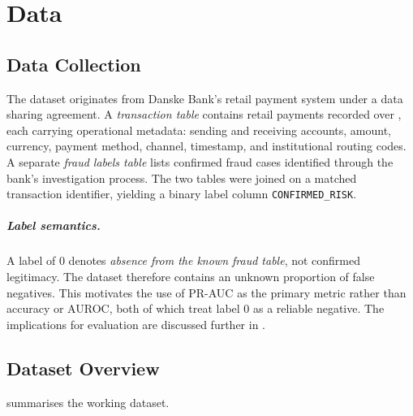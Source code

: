 
\chapter{Data}
\label{chap:data}

\section{Data Collection}
\label{sec:data-collection}

The dataset originates from Danske Bank's retail payment system under a data sharing agreement. A \emph{transaction table} contains  retail payments recorded over , each carrying operational metadata: sending and receiving accounts, amount, currency, payment method, channel, timestamp, and institutional routing codes. A separate \emph{fraud labels table} lists confirmed fraud cases identified through the bank's investigation process. The two tables were joined on a matched transaction identifier, yielding a binary label column \texttt{CONFIRMED\_RISK}.

\paragraph{Label semantics.}
A label of 0 denotes \emph{absence from the known fraud table}, not confirmed legitimacy. The dataset therefore contains an unknown proportion of false negatives. This motivates the use of PR-AUC as the primary metric rather than accuracy or AUROC, both of which treat label 0 as a reliable negative. The implications for evaluation are discussed further in .

\section{Dataset Overview}
\label{sec:data-overview}

 summarises the working dataset.

